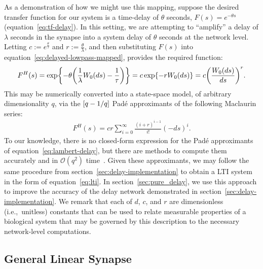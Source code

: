 \documentclass[12pt]{article}
\theoremstyle{definition}
\let\originalleft\left
\let\originalright\right
\renewcommand{\left}{\mathopen{}\mathclose\bgroup\originalleft}
\renewcommand{\right}{\aftergroup\egroup\originalright}
\begin{document}
As a demonstration of how we might use this mapping, suppose the desired transfer function for our system is a time-delay of $\theta$ seconds, $F(s) = e^{-\theta s}$ (equation~\ref{eq:tf-delay}).
In this setting, we are attempting to ``amplify'' a delay of $\lambda$ seconds in the synapse into a system delay of $\theta$ seconds at the network level.
Letting $c := e^{\frac{\theta}{\tau}}$ and $r := \frac{\theta}{\lambda}$, and then substituting $F(s)$ into equation~\ref{eq:delayed-lowpass-mapped}, provides the required function:
\begin{align}
F^H(s) = \exp \left\{ -\theta \left( \frac{1}{\lambda} W_0(ds) - \frac{1}{\tau} \right) \right\} = c \exp \left\{-r W_0(ds) \right\} = c \left( \frac{W_0(ds)}{ds} \right)^r \text{.} \nonumber
\end{align}
This may be numerically converted into a state-space model, of arbitrary dimensionality $q$, via the $\left[q-1/q\right]$ Pad\'e approximants of the following Maclaurin series:
\begin{align} \label{eq:lambert-delay}
F^H(s) = c r \sum_{i=0}^\infty \frac{(i+r)^{i-1}}{i!} (-ds)^i \text{.}
\end{align}
To our knowledge, there is no closed-form expression for the Pad\'e approximants of equation~\ref{eq:lambert-delay}, but there are methods to compute them accurately and in $\mathcal{O}(q^2)$ time~\citep{sidi2003practical}.
Given these approximants, we may follow the same procedure from section~\ref{sec:delay-implementation} to obtain a LTI system in the form of equation~\ref{eq:lti}.
In section~\ref{sec:pure_delay}, we use this approach to improve the accuracy of the delay network demonstrated in section~\ref{sec:delay-implementation}. %
We remark that each of $d$, $c$, and $r$ are dimensionless (i.e.,~unitless) constants that can be used to relate measurable properties of a biological system that may be governed by this description to the necessary network-level computations.

\subsection{General Linear Synapse}
\label{sec:general}
\end{document}
